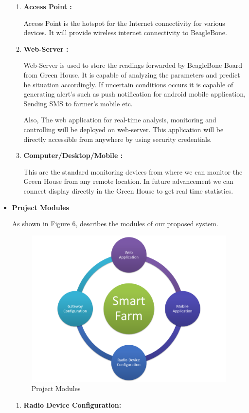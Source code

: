 \documentclass[10pt,a4paper]{article}
\begin{document}
\begin{itemize}
\begin{enumerate}
\item \textbf{Access Point : }

\quad
Access Point is the hotspot for the Internet connectivity for various devices. It will provide wireless internet connectivity to BeagleBone.  

\item \textbf{Web-Server : }

\quad
Web-Server is used to store the readings forwarded by BeagleBone Board from Green House. It is capable of analyzing the parameters and predict he situation accordingly. If uncertain conditions occurs it is capable of generating alert's such as push notification for android mobile application, Sending SMS to farmer's mobile etc. 

\quad
Also, The web application for real-time analysis, monitoring and controlling will be deployed on web-server. This application will be directly accessible from anywhere by using security credentials.

\item \textbf{Computer/Desktop/Mobile : }

\quad
This are the standard monitoring devices from where we can monitor the Green House from any remote location. In future advancement we can connect display directly in the Green House to get real time statistics.
\end{enumerate}
\item \textbf{Project Modules}

\quad
As shown in Figure 6, describes the modules of our proposed system.

\begin{figure}[hbtp]
\centering
\includegraphics[scale=0.5]{Diagrams.png}
\caption{Project Modules }
\end{figure}
\begin{enumerate}
\item \textbf{Radio Device Configuration:}


\end{enumerate}
\end{itemize}
\end{document}
